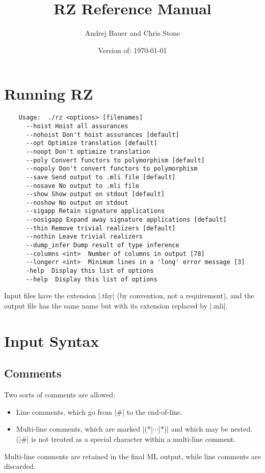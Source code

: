 \documentclass[11pt]{article}
\title{RZ Reference Manual}
\date{\vspace{-0.25cm}Version of: \today}
\author{Andrej Bauer and Chris Stone}
\begin{document}
\maketitle

\VerbatimFootnotes

\section{Running RZ}

\begin{Verbatim}
	Usage:  ./rz <options> [filenames]
	  --hoist Hoist all assurances
	  --nohoist Don't hoist assurances [default]
	  --opt Optimize translation [default]
	  --noopt Don't optimize translation
	  --poly Convert functors to polymorphism [default]
	  --nopoly Don't convert functors to polymorphism
	  --save Send output to .mli file [default]
	  --nosave No output to .mli file
	  --show Show output on stdout [default]
	  --noshow No output on stdout
	  --sigapp Retain signature applications
	  --nosigapp Expand away signature applications [default]
	  --thin Remove trivial realizers [default]
	  --nothin Leave trivial realizers
	  --dump_infer Dump result of type inference
	  --columns <int>  Number of columns in output [78]
	  --longerr <int>  Minimum lines in a 'long' error message [3]
	  -help  Display this list of options
	  --help  Display this list of options
\end{Verbatim}

Input files have the extension |.thy| (by convention, not a requirement), and the 
output file has the same name but with its extension replaced by |.mli|.

\section{Input Syntax}

\subsection{Comments}

Two sorts of comments are allowed:
\begin{itemize}
\item Line comments, which go from |#| to the end-of-line.
\item Multi-line comments, which are marked |(*|$\cdots$|*)| and which may be nested. (|#| is not treated as a
  special character within a multi-line comment.
\end{itemize}
Multi-line comments are retained in the final ML output, while line
  comments are discarded.
\goodbreak
\end{document}
